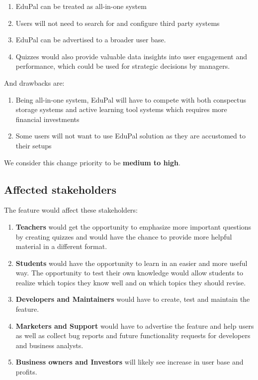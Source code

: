 \documentclass[
    english, %
]{VUMIFPSkursinis}
\begin{document}
\begin{enumerate}
    \item EduPal can be treated as all-in-one system
    \item Users will not need to search for and configure third party systems
    \item EduPal can be advertised to a broader user base.
    \item Quizzes would also provide valuable data insights into user engagement and performance, which could be used for strategic decisions by managers.
\end{enumerate}

And drawbacks are:

\begin{enumerate}
    \item Being all-in-one system, EduPal will have to compete with both conspectus storage systems and active learning tool systems which requires more financial investments
    \item Some users will not want to use EduPal solution as they are accustomed to their setups
\end{enumerate}

We consider this change priority to be \textbf{medium to high}.

\subsection{Affected stakeholders}

The feature would affect these stakeholders:

\begin{enumerate}
    \item \textbf{Teachers} would get the opportunity to emphasize more important questions by creating quizzes and would have the chance to provide more helpful material in a different format.
    \item \textbf{Students} would have the opportunity to learn in an easier and more useful way. The opportunity to test their own knowledge would allow students to realize which topics they know well and on which topics they should revise.
    \item \textbf{Developers and Maintainers} would have to create, test and maintain the feature.
    \item \textbf{Marketers and Support} would have to advertise the feature and help users as well as collect bug reports and future functionality requests for developers and business analysts.
    \item \textbf{Business owners and Investors} will likely see increase in user base and profits.
\end{enumerate}
\end{document}
